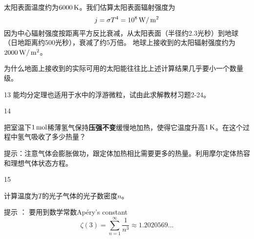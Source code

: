 \documentclass[CJK]{beamer}
\begin{document}
\begin{frame}
\bch

太阳表面温度约为$6000\,\mathrm{K}$。我们估算太阳表面辐射强度为
$$j = \sigma T^4 = 10^8 \,\mathrm{W}/\,\mathrm{m}^2 $$
因为中心辐射强度按距离平方反比衰减，从太阳表面（半径约2.3光秒）到地球（日地距离约500光秒），衰减了约5万倍。
地球上接收到的太阳辐射强度约为$2000\,\mathrm{W}/\,\mathrm{m}^2$。



\ech
\end{frame}

\begin{frame}
\bch


为什么地面上接收到的实际可用的太阳能往往比上述计算结果几乎要小一个数量级。

\ech
\end{frame}

\begin{frame}
\bch
\bitem
\item[13]{能均分定理也适用于水中的浮游微粒，试由此求解教材习题2-24。}
\item[14]{把室温下$1\,\mathrm{mol}$稀薄氢气保持{\bf 压强不变}缓慢地加热，使得它温度升高$1\,\mathrm{K}$。在这个过程中氢气吸收了多少热量？

\scriptsize
提示：注意气体会膨胀做功，跟定体加热相比需要更多的热量。利用摩尔定体热容和理想气体状态方程。
}
\item[15]{计算温度为$T$的光子气体的光子数密度$n$。

\skipline

{\scriptsize 提示 ： 要用到数学常数Ap{\'e}ry's constant
$$\zeta(3) = \sum_{n=1}^\infty \frac{1}{n^3} \approx 1.2020569\ldots $$}}
\eitem
\ech
\end{frame}
\end{document}
